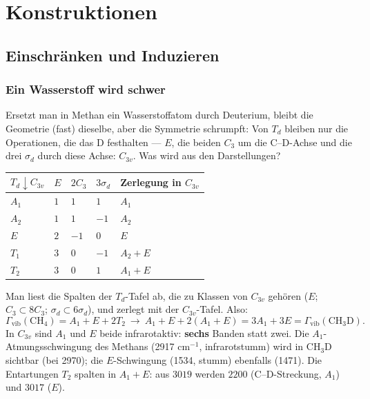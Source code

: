 \part{Konstruktionen}

\chapter{Einschränken und Induzieren}

\section{Ein Wasserstoff wird schwer}

\begin{merksatz}
Ersetzt man in Methan ein Wasserstoffatom durch Deuterium, bleibt die Geometrie (fast) dieselbe, aber die Symmetrie schrumpft: Von $T_d$ bleiben nur die Operationen, die das D festhalten --- $E$, die beiden $C_3$ um die C--D-Achse und die drei $\sigma_d$ durch diese Achse: $C_{3v}$. Was wird aus den Darstellungen?

\begin{center}
{\small
\renewcommand{\arraystretch}{1.46}
\begin{tabular}{@{}P{1.4cm}P{0.7cm}P{1.0cm}P{1.0cm}P{3.2cm}@{}}
\toprule
$T_d\downarrow C_{3v}$ & $E$ & $2C_3$ & $3\sigma_d$ & \textbf{Zerlegung in $C_{3v}$}\\
\midrule
$A_1$ & $1$ & $1$ & $1$ & $A_1$\\
$A_2$ & $1$ & $1$ & $-1$ & $A_2$\\
$E$ & $2$ & $-1$ & $0$ & $E$\\
$T_1$ & $3$ & $0$ & $-1$ & $A_2 + E$\\
$T_2$ & $3$ & $0$ & $1$ & $A_1 + E$\\
\bottomrule
\end{tabular}}
\end{center}
Man liest die Spalten der $T_d$-Tafel ab, die zu Klassen von $C_{3v}$ gehören ($E$; $C_3\subset8C_3$; $\sigma_d\subset6\sigma_d$), und zerlegt mit der $C_{3v}$-Tafel. Also:
\[ \Gamma_{\mathrm{vib}}(\mathrm{CH_4}) = A_1 + E + 2T_2\ \longrightarrow\ A_1 + E + 2(A_1 + E) = 3A_1 + 3E = \Gamma_{\mathrm{vib}}(\mathrm{CH_3D}) . \]
In $C_{3v}$ sind $A_1$ und $E$ beide infrarotaktiv: \textbf{sechs} Banden statt zwei. Die $A_1$-Atmungsschwingung des Methans (2917 cm$^{-1}$, infrarotstumm) wird in $\mathrm{CH_3D}$ sichtbar (bei 2970); die $E$-Schwingung (1534, stumm) ebenfalls (1471). Die Entartungen $T_2$ spalten in $A_1 + E$: aus $3019$ werden $2200$ (C--D-Streckung, $A_1$) und $3017$ ($E$).


\end{merksatz}
